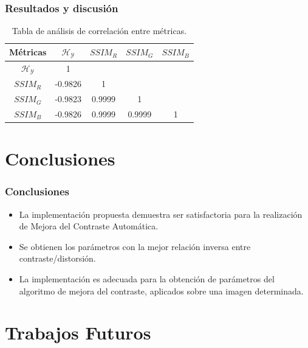 \documentclass[usenames,dvipsnames]{beamer}
\begin{document}
\begin{frame}
\frametitle{Resultados y discusión} 
\begin{table}[H]
\setlength{\abovecaptionskip}{2pt plus 3pt minus 2pt} %
\caption[Parámetros de entrada para $MOPSO$]{Tabla de análisis de correlación entre métricas.}
\begin{center}
\begin{tabular}{||c | c c c c||} 
\hline
Métricas & $\mathscr{H_Y}$ & $SSIM_R$ & $SSIM_G$ & $SSIM_B$ \\ 
\hline
$\mathscr{H_Y}$ & 1 &   &   &  \\ 
\hline
$SSIM_R$ & -0.9826  & 1 &  &  \\ 
\hline
$SSIM_G$ & -0.9823 & 0.9999   & 1   &  \\ 
\hline
$SSIM_B$ & -0.9826 & 0.9999   & 0.9999   & 1 \\ 
\hline
\end{tabular}
\end{center}
\label{table:correlacion}
\end{table}

\end{frame}


\section{Conclusiones}

\begin{frame}
\frametitle{Conclusiones} 
\begin{exampleblock}{}
\begin{itemize}
	\item La implementación propuesta demuestra ser satisfactoria para la realización de Mejora del Contraste Automática.
	\item Se obtienen los parámetros con la mejor relación inversa entre contraste/distorsión.
	\item La implementación es adecuada para la obtención de parámetros del algoritmo de mejora del contraste, aplicados sobre una imagen determinada.
\end{itemize}
\end{exampleblock}
\end{frame}


\section{Trabajos Futuros}
\end{document}
